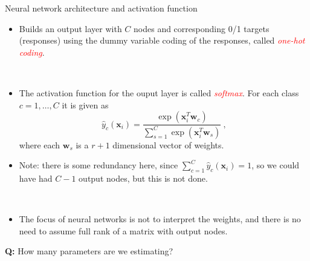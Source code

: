 \documentclass[10pt,ignorenonframetext,]{beamer}
\providecommand{\tightlist}{%
  \setlength{\itemsep}{0pt}\setlength{\parskip}{0pt}}
\begin{document}
\begin{frame}

\begin{block}{Neural network architecture and activation function}

\vspace{4mm}

\begin{itemize}
\tightlist
\item
  Builds an output layer with \(C\) nodes and corresponding 0/1 targets
  (responses) using the dummy variable coding of the responses, called
  \emph{\textcolor{red}{one-hot coding}}.
\end{itemize}

\(~\)

\begin{itemize}
\item
  The activation function for the ouput layer is called
  \emph{\textcolor{red}{softmax}}. For each class \(c=1,\ldots, C\) it
  is given as \[
  \hat{y}_c({\boldsymbol x}_i) = \frac{\exp({\boldsymbol x}_i^T{\boldsymbol w}_c)}{\sum_{s=1}^{C}\exp({\boldsymbol x}_i^T{\boldsymbol w}_s)} \ ,
  \] where each \({\boldsymbol w}_s\) is a \(r+1\) dimensional vector of
  weights.
\item
  Note: there is some redundancy here, since
  \(\sum_{c=1}^C {\hat y}_{c}({\boldsymbol x}_i)=1\), so we could have
  had \(C-1\) output nodes, but this is not done.
\end{itemize}

\(~\)

\begin{itemize}
\tightlist
\item
  The focus of neural networks is not to interpret the weights, and
  there is no need to assume full rank of a matrix with output nodes.
\end{itemize}

\textbf{Q:} How many parameters are we estimating?

\end{block}

\end{frame}
\end{document}

